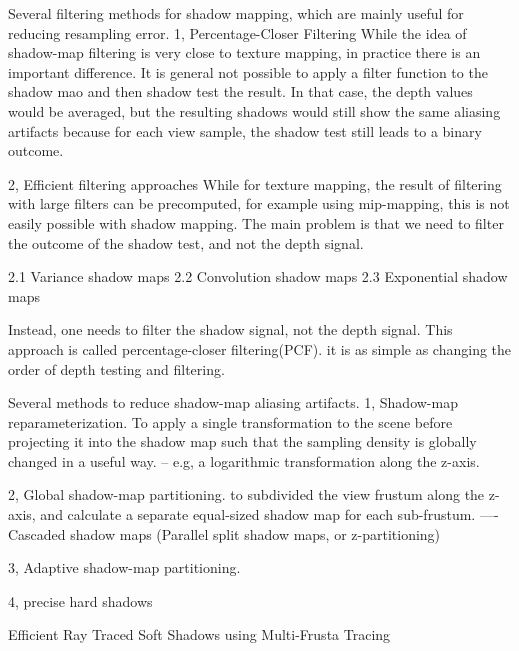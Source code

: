 Several filtering methods for shadow mapping, which are mainly useful for reducing resampling error.
1, Percentage-Closer Filtering
While the idea of shadow-map filtering is very close to texture mapping, in practice there is an important difference. It is general not possible to apply a filter function to the shadow mao and then shadow test the result. In that case, the depth values would be averaged, but the resulting shadows would still show the same aliasing artifacts because for each view sample, the shadow test still leads to a binary outcome.

2, Efficient filtering approaches
While for texture mapping, the result of filtering with large filters can be precomputed, for example using mip-mapping, this is not easily possible with shadow mapping. The main problem is that we need to filter the outcome of the shadow test, and not the depth signal.

2.1 Variance shadow maps
2.2 Convolution shadow maps
2.3 Exponential shadow maps





Instead, one needs to filter the shadow signal, not the depth signal. This approach is called percentage-closer filtering(PCF). it is as simple as changing the order of depth testing and filtering.



Several methods to reduce shadow-map aliasing artifacts. 
1, Shadow-map reparameterization. To apply a single transformation to the scene before projecting it into the shadow map such that the sampling density is globally changed in a useful way. -- e.g, a logarithmic transformation along the z-axis.

2, Global shadow-map partitioning. to subdivided the view frustum along the z-axis, and calculate a separate equal-sized shadow map for each sub-frustum. ----Cascaded shadow maps (Parallel split shadow maps, or z-partitioning)

3, Adaptive shadow-map partitioning. 

4, precise hard shadows

Efficient Ray Traced Soft Shadows using Multi-Frusta Tracing